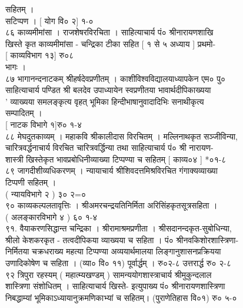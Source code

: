 \documentclass[11pt, openany]{book}
\begin{document}
{{{{{{{{{{{{{{{{{{{{{{{{{{{{{{{{{{{{{{{{{{{{{{{{{{{{{{{{{{{{{{{{{{{{{{{{{{{{{{{{{{{{{{{{{{{{{{{{{{{{{{{{{{{{{{{{{{{{{{{{{{{{{{{{{{{{{{{{{{{{{{{{{{{{{{{{{{{{{{{{{{{{{{{{{{{सहितम् ।\\
सटिप्पण । {[} योग वि० २{]} १-०\\
८६ काव्यमीमांसा । राजशेषरविरचिता । साहित्याचार्य पं० श्रीनारायणशाखि\\
खिस्ते कृत काव्यमीमांसा - चन्द्रिका टीका सहित [ १ से ५ अध्याय ]
प्रथमो-\\
{[} काव्यविभाग १३{]} रु०८\\
भागः ।\\
८७ भागानन्दनाटकम् \textbar{} श्रीहर्षदेवप्रणीतम् ।
काशीविश्वविद्यालयाध्यापकेन एम० पु०\\
साहित्याचार्य पण्डित श्री बलदेव उपाध्यायेन स्वप्रणीतया
भावार्थदीपिकाख्यया\\
' व्याख्यया समलङ्कृत्य वृहत् भूमिका हिन्दीभाषानुवादादिभिः सनाथीकृत्य\\
सम्पादितम् ।\\
{[} नाटक विभागे १{]}रु० १-४\\
८८ मेघदुतकाव्यम् । महाकवि श्रीकालीदास विरचितम् । मल्लिनाथकृत
सञ्जीविन्या,\\
चारित्रवर्द्धनाचार्य विरचित चारित्रवर्द्धिन्या तथा साहित्याचार्य पं०
श्री नारायण-\\
शास्त्री खिस्तेकृत भावप्रबोधिनीव्याख्या टिप्पण्या च सहितम् \textbar{}
{[} काव्य०४ {]} *०१-८\\
८९ जागदीशीव्यधिकरणम् । न्यायाचार्य श्रीशिवदत्तमिश्रविरचित
गंगाक्यव्याख्या\\
टिप्पणी सहितम् ।\\
( न्यायविभागे २ ) ३० २=०\\
९० काव्यकल्पलतावृत्तिः । श्रीअमरचन्द्रयतिनिर्मिता अरिसिंहकृतसूत्रसहिता
।\\
( अलङ्कारविभागे ४ ) ६० १-४\\
९१. वैयाकरणसिद्धान्त चन्द्रिका । श्रीरामाश्रमप्रणीता ।
श्रीसदानन्दकृत-सुबोधिन्या,\\
श्रीलो केशकरकृत - तत्वदीपिकया व्याख्यया च सहिता । पं०
श्रीनवकिशोरशास्त्रिणा-\\
निर्मितया चक्रधराख्य महत्या टिप्पण्या अव्ययार्थमालया
लिङ्गानुशासनप्रक्रियया\\
उणादिकोषेण च सहिता । (व्या० वि० ११) पूर्वार्द्धम् । रु०२-८ उत्तरार्द्ध
\textbar{} रु० २-८\\
९२ त्रिपुरा रहस्यम् ( महात्म्यखण्डम् ) सामन्ययोगशास्त्राचार्य
श्रीमुकुन्दलाल\\
शास्त्रिणा संशोधितम् । साहित्याचार्य खिस्ते- इत्युपाख्य पं०
श्रीनारायणशास्त्रिणा\\
निबद्धाम्यां भूमिकाऽध्यायानुक्रमणिकाभ्यां च सहितम्। (पुराणेतिहास वि०१)
रु० ५-०\\
}}}}}}}}}}}}}}}}}}}}}}}}}}}}}}}}}}}}}}}}}}}}}}}}}}}}}}}}}}}}}}}}}}}}}}}}}}}}}}}}}}}}}}}}}}}}}}}}}}}}}}}}}}}}}}}}}}}}}}}}}}}}}}}}}}}}}}}}}}}}}}}}}}}}}}}}}}}}}}}}}}}}}}}}}}}
\end{document}
